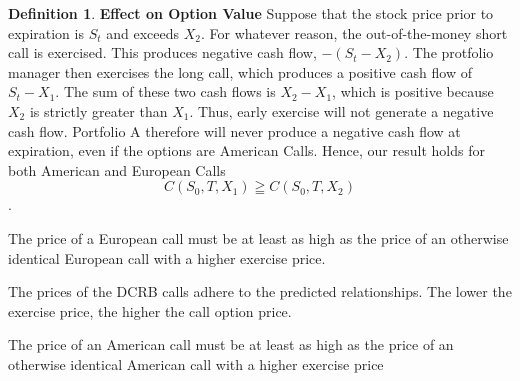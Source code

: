 \documentclass{book}
\theoremstyle{definition}
\newtheorem{definition}{Definition}[section]
\theoremstyle{remark}
\begin{document}
\begin{definition}{\textbf{Effect on Option Value}}
                Suppose that the stock price prior to expiration is $S_t$ and exceeds $X_2$. For whatever reason, the out-of-the-money short call is exercised. This produces negative cash flow, $-(S_t - X_2)$. The protfolio manager then exercises the long call, which produces a positive cash flow of $S_t - X_1$. The sum of these two cash flows is $X_2 - X_1$, which is positive because $X_2$ is strictly greater than $X_1$. Thus, early exercise will not generate a negative cash flow. Portfolio A therefore will never produce a negative cash flow at expiration, even if the options are American Calls. Hence, our result holds for both American and European Calls $$ C(S_0, T, X_1) \geqq C(S_0, T, X_2) $$. 
                
        \begin{tcolorbox}[colback=blue!5!white,colframe=blue!75!black, title=Sticky Note]
            The price of a European call must be at least as high as the price of an otherwise identical European call with a higher exercise price.
        \end{tcolorbox}  
                
                The prices of the DCRB calls adhere to the predicted relationships. The lower the exercise price, the higher the call option price.
            
        \begin{tcolorbox}[colback=blue!5!white,colframe=blue!75!black, title=Sticky Note]
            The price of an American call must be at least as high as the price of an otherwise identical American call with a higher exercise price 
        \end{tcolorbox}              
            \end{definition}
            
\end{document}
